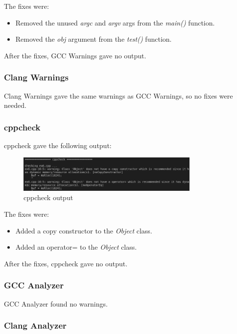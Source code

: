 \documentclass{article}
\begin{document}
The fixes were:

\begin{itemize}
    \item Removed the unused \textit{argc} and \textit{argv} args from the \textit{main()} function.
    \item Removed the \textit{obj} argument from the \textit{test()} function.
\end{itemize}

After the fixes, GCC Warnings gave no output.

\subsubsection{Clang Warnings}

Clang Warnings gave the same warnings as GCC Warnings, so no fixes were needed.

\subsubsection{cppcheck}

cppcheck gave the following output:

\begin{figure}[ht!]
    \centering
    \includegraphics[width=0.8\textwidth]{images/ex6/cppcheck.png}
    \caption{cppcheck output}\label{fig:ex6/cppcheck}
\end{figure}

The fixes were:

\begin{itemize}
    \item Added a copy constructor to the \textit{Object} class.
    \item Added an operator= to the \textit{Object} class.
\end{itemize}

After the fixes, cppcheck gave no output.

\subsubsection{GCC Analyzer}

GCC Analyzer found no warnings.

\subsubsection{Clang Analyzer}
\end{document}
